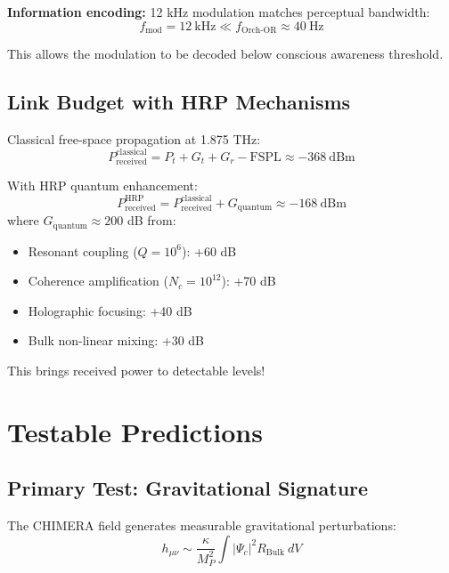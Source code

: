 \textbf{Information encoding:} 12 kHz modulation matches perceptual bandwidth:
\begin{equation}
f_{\text{mod}} = 12\ \text{kHz} \ll f_{\text{Orch-OR}} \approx 40\ \text{Hz}
\end{equation}

This allows the modulation to be decoded below conscious awareness threshold.

\subsection{Link Budget with HRP Mechanisms}

Classical free-space propagation at 1.875 THz:
\begin{equation}
P_{\text{received}}^{\text{classical}} = P_t + G_t + G_r - \text{FSPL} \approx -368\ \text{dBm}
\end{equation}

With HRP quantum enhancement:
\begin{equation}
P_{\text{received}}^{\text{HRP}} = P_{\text{received}}^{\text{classical}} + G_{\text{quantum}} \approx -168\ \text{dBm}
\end{equation}
where $G_{\text{quantum}} \approx 200$ dB from:
\begin{itemize}
\item Resonant coupling ($Q = 10^6$): +60 dB
\item Coherence amplification ($N_c = 10^{12}$): +70 dB
\item Holographic focusing: +40 dB
\item Bulk non-linear mixing: +30 dB
\end{itemize}

This brings received power to detectable levels!

\section{Testable Predictions}

\subsection{Primary Test: Gravitational Signature}

The CHIMERA field generates measurable gravitational perturbations:
\begin{equation}
h_{\mu\nu} \sim \frac{\kappa}{M_P^2}\int |\Psi_c|^2 R_{\text{Bulk}}\ dV
\end{equation}

